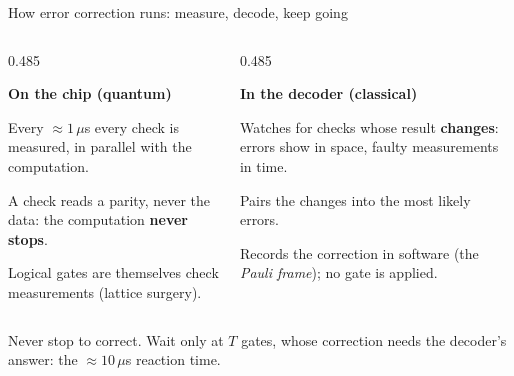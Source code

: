 \documentclass[aspectratio=169,11pt]{beamer}
\newcommand{\blocktitle}[1]{{\bfseries #1}\par\vskip1mm}
\begin{document}
{
\begin{frame}[noframenumbering]{How error correction runs: measure, decode, keep going}
  \begin{columns}[T,onlytextwidth]
    \begin{column}{0.485\textwidth}
      \begin{panel}[equal height group=ecr]
        \blocktitle{On the chip (quantum)}
        \small
        Every ${\approx}1\,\mu$s every check is measured, in parallel with the computation.\par\vskip1mm
        A check reads a parity, never the data: the computation \textbf{never stops}.\par\vskip1mm
        Logical gates are themselves check measurements (lattice surgery).
      \end{panel}
    \end{column}
    \begin{column}{0.485\textwidth}
      \begin{panel}[equal height group=ecr]
        \blocktitle{In the decoder (classical)}
        \small
        Watches for checks whose result \textbf{changes}: errors show in space, faulty measurements in time.\par\vskip1mm
        Pairs the changes into the most likely errors.\par\vskip1mm
        Records the correction in software (the \emph{Pauli frame}); no gate is applied.
      \end{panel}
    \end{column}
  \end{columns}
  \vskip1mm
  \begin{takeaway}Never stop to correct. Wait only at $T$ gates, whose correction needs the decoder's answer: the ${\approx}10\,\mu$s reaction time.\end{takeaway}
\end{frame}}
\end{document}
